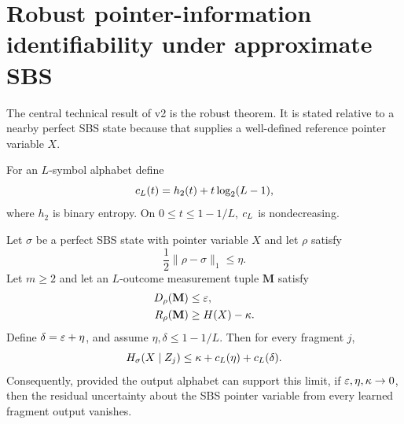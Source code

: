 \section{Robust pointer-information identifiability under approximate SBS}

The central technical result of v2 is the robust theorem. It is stated relative to a nearby perfect SBS state because that supplies a well-defined reference pointer variable $X$.

For an $L$-symbol alphabet define
\begin{equation}
c_L(t)=h_2(t)+t\log_2(L-1),
\label{eq:cL}
\end{equation}
where $h_2$ is binary entropy. On $0\le t\le1-1/L$, $c_L$ is nondecreasing.

\begin{theorem}
\label{thm:robust}
Let $\sigma$ be a perfect SBS state with pointer variable $X$ and let $\rho$ satisfy
\begin{equation}
\frac12\|\rho-\sigma\|_1\le\eta.
\label{eq:traceclose}
\end{equation}
Let $m\ge2$ and let an $L$-outcome measurement tuple $\mathbf M$ satisfy
\begin{align}
D_\rho(\mathbf M)&\le\varepsilon,\label{eq:robdis}\\
R_\rho(\mathbf M)&\ge H(X)-\kappa.\label{eq:robrich}
\end{align}
Define $\delta=\varepsilon+\eta$, and assume $\eta,\delta\le1-1/L$. Then for every fragment $j$,
\begin{equation}
H_\sigma(X\mid Z_j)
\le
\kappa+c_L(\eta)+c_L(\delta).
\label{eq:robustbound}
\end{equation}
Consequently, provided the output alphabet can support this limit, if $\varepsilon,\eta,\kappa\to0$, then the residual uncertainty about the SBS pointer variable from every learned fragment output vanishes.
\end{theorem}

